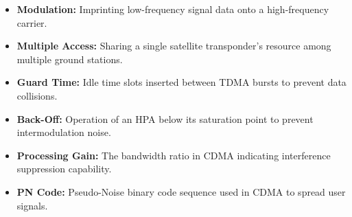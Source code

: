 \documentclass[12pt,a4paper]{article}
\begin{document}
\begin{tcolorbox}[defbox, title={\textbf{One-Line Definitions}}]
\begin{itemize}[leftmargin=*, itemsep=2.5pt, topsep=0pt]
  \item \textbf{Modulation:} Imprinting low-frequency signal data onto a high-frequency carrier.
  \item \textbf{Multiple Access:} Sharing a single satellite transponder's resource among multiple ground stations.
  \item \textbf{Guard Time:} Idle time slots inserted between TDMA bursts to prevent data collisions.
  \item \textbf{Back-Off:} Operation of an HPA below its saturation point to prevent intermodulation noise.
  \item \textbf{Processing Gain:} The bandwidth ratio in CDMA indicating interference suppression capability.
  \item \textbf{PN Code:} Pseudo-Noise binary code sequence used in CDMA to spread user signals.
\end{itemize}
\end{tcolorbox}
\end{document}
